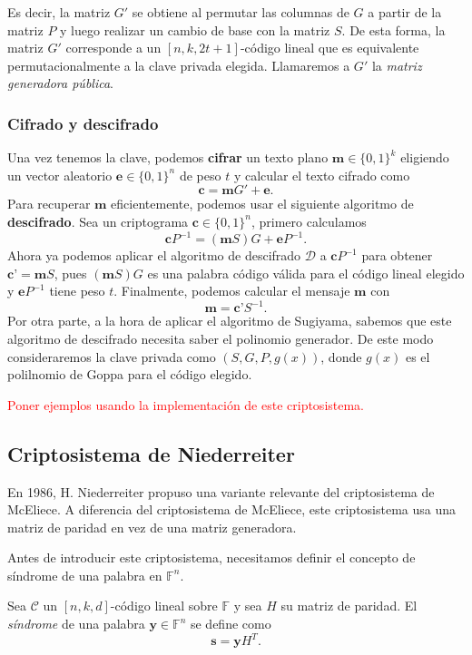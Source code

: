 Es decir, la matriz $G'$ se obtiene al permutar las columnas de $G$ a partir de la matriz $P$ y luego realizar un cambio de base con la matriz $S$. De esta forma, la matriz $G'$ corresponde a un $[n, k, 2t + 1]$-código lineal que es equivalente permutacionalmente a la clave privada elegida. Llamaremos a $G'$ la \emph{matriz generadora pública}.

\subsubsection{Cifrado y descifrado}

Una vez tenemos la clave, podemos \textbf{cifrar} un texto plano $\textbf{m} \in \{ 0, 1 \}^k$ eligiendo un vector aleatorio $\textbf{e} \in \{ 0, 1 \}^n$ de peso $t$ y calcular el texto cifrado como
\[
    \textbf{c} = \textbf{m} G' + \textbf{e}.
\]
Para recuperar $\textbf{m}$ eficientemente, podemos usar el siguiente algoritmo de \textbf{descifrado}. Sea un criptograma $\textbf{c} \in \{ 0, 1 \}^n$, primero calculamos
\[
    \textbf{c} P^{-1} = (\textbf{m} S) G + \textbf{e} P^{-1}.
\]
Ahora ya podemos aplicar el algoritmo de descifrado $\mathcal{D}$ a $\textbf{c} P^{-1}$ para obtener $\textbf{c'} = \textbf{m} S$, pues $(\textbf{m} S) G$ es una palabra código válida para el código lineal elegido y $\textbf{e} P^{-1}$ tiene peso $t$. Finalmente, podemos calcular el mensaje $\textbf{m}$ con
\[
    \textbf{m} = \textbf{c'} S^{-1}.
\]
Por otra parte, a la hora de aplicar el algoritmo de Sugiyama, sabemos que este algoritmo de descifrado necesita saber el polinomio generador. De este modo consideraremos la clave privada como $(S, G, P, g(x))$, donde $g(x)$ es el polilnomio de Goppa para el código elegido.

\textcolor{red}{Poner ejemplos usando la implementación de este criptosistema.}


\subsection{Criptosistema de Niederreiter}

En 1986, H. Niederreiter \cite{Niederreiter_1986} propuso una variante relevante del criptosistema de McEliece. A diferencia del criptosistema de McEliece, este criptosistema usa una matriz de paridad en vez de una matriz generadora.

Antes de introducir este criptosistema, necesitamos definir el concepto de síndrome de una palabra en $\mathbb{F}^n$.

\begin{definition}
    Sea $\mathcal{C}$ un $[n, k, d]$-código lineal sobre $\mathbb{F}$ y sea $H$ su matriz de paridad. El \emph{síndrome} de una palabra $\textbf{y} \in \mathbb{F}^n$ se define como
    \[
        \textbf{s} = \textbf{y} H^T.
    \]
\end{definition}

